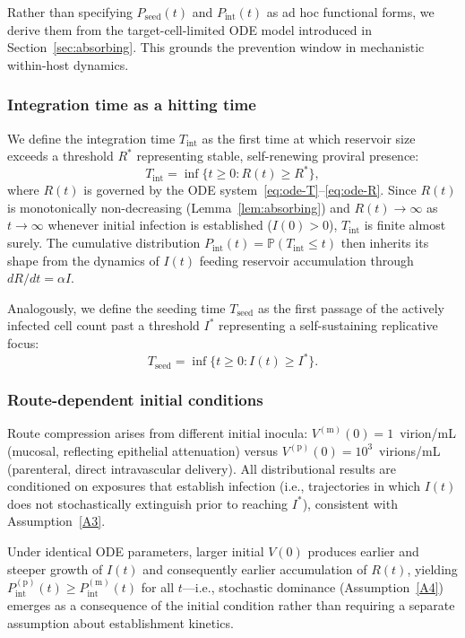 \documentclass[12pt,a4paper]{article}
\theoremstyle{plain}
\theoremstyle{definition}
\theoremstyle{remark}
\newcommand{\Pint}{P_{\mathrm{int}}}
\newcommand{\Pseed}{P_{\mathrm{seed}}}
\newcommand{\Prob}{\mathbb{P}}
\begin{document}
Rather than specifying $\Pseed(t)$ and $\Pint(t)$ as ad hoc functional forms, we derive them from the target-cell-limited ODE model introduced in Section~\ref{sec:absorbing}. This grounds the prevention window in mechanistic within-host dynamics.

\subsubsection{Integration time as a hitting time}

We define the integration time $T_{\mathrm{int}}$ as the first time at which reservoir size exceeds a threshold $R^*$ representing stable, self-renewing proviral presence:
\begin{equation}\label{eq:hitting}
    T_{\mathrm{int}} = \inf\{t \geq 0 : R(t) \geq R^*\},
\end{equation}
where $R(t)$ is governed by the ODE system~\eqref{eq:ode-T}--\eqref{eq:ode-R}. Since $R(t)$ is monotonically non-decreasing (Lemma~\ref{lem:absorbing}) and $R(t) \to \infty$ as $t \to \infty$ whenever initial infection is established ($I(0) > 0$), $T_{\mathrm{int}}$ is finite almost surely. The cumulative distribution $\Pint(t) = \Prob(T_{\mathrm{int}} \leq t)$ then inherits its shape from the dynamics of $I(t)$ feeding reservoir accumulation through $dR/dt = \alpha I$.

Analogously, we define the seeding time $T_{\mathrm{seed}}$ as the first passage of the actively infected cell count past a threshold $I^*$ representing a self-sustaining replicative focus:
\begin{equation}\label{eq:hitting-seed}
    T_{\mathrm{seed}} = \inf\{t \geq 0 : I(t) \geq I^*\}.
\end{equation}

\subsubsection{Route-dependent initial conditions}

Route compression arises from different initial inocula: $V^{(\mathrm{m})}(0) = 1$~virion/mL (mucosal, reflecting epithelial attenuation) versus $V^{(\mathrm{p})}(0) = 10^3$~virions/mL (parenteral, direct intravascular delivery). All distributional results are conditioned on exposures that establish infection (i.e., trajectories in which $I(t)$ does not stochastically extinguish prior to reaching $I^*$), consistent with Assumption~\ref{A3}.

Under identical ODE parameters, larger initial $V(0)$ produces earlier and steeper growth of $I(t)$ and consequently earlier accumulation of $R(t)$, yielding $\Pint^{(\mathrm{p})}(t) \geq \Pint^{(\mathrm{m})}(t)$ for all $t$---i.e., stochastic dominance (Assumption~\ref{A4}) emerges as a consequence of the initial condition rather than requiring a separate assumption about establishment kinetics.
\end{document}
